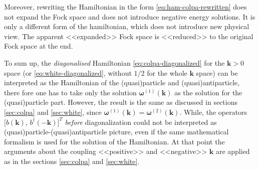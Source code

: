 \documentclass[a4paper,12pt]{article}
\begin{document}
            Moreover, rewriting the Hamiltonian in the form \eqref{eq:ham-colpa-rewritten} does not expand 
            the Fock space and does not introduce negative energy solutions. It is only a different form of the hamiltonian, 
            which does not introduce new physical view. The apparent <<expanded>> Fock space is <<reduced>> to the original Fock space at the end. 

            To sum up, the \textit{diagonalised} Hamiltonian \eqref{eq:colpa-diagonalized} for the $\boldsymbol{k} > 0$ space 
            (or \eqref{eq:white-diagonalized}, without $1/2$ for the whole $\boldsymbol{k}$ space) can be interpreted as the Hamiltonian of the 
            (quasi)particle and (quasi)antiparticle, there fore one has to take only the 
            solution $\boldsymbol{\omega}^{(1)}(\boldsymbol{k})$ as the solution for the (quasi)particle part.
            However, the result is the same as discussed in sections \ref{sec:colpa} and \ref{sec:white}, 
            since $\boldsymbol{\omega}^{(1)}(\boldsymbol{k}) = \boldsymbol{\omega}^{(2)}(\boldsymbol{k})$.
            While, the operators $[b(\boldsymbol{k})$, $b^{\dag}(-\boldsymbol{k})]^T$ \textit{before}
            diagonalization could not be interpreted as (quasi)particle-(quasi)antiparticle picture, 
            even if the same mathematical formalism is used for the solution of the Hamiltonian. 
            At that point the arguments about the coupling <<positive>> and <<negative>> $\boldsymbol{k}$ 
            are applied as in the sections \ref{sec:colpa} and \ref{sec:white}.

    

    

     
     



\end{document}
